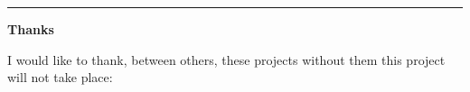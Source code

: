%
%
%

\newpage
\hrule
{}
{}
\begin{flushright}
{\huge \textbf{Thanks}}
\end{flushright}
\vspace{1cm}

\noindent
I would like to thank, between others, these projects without them this project will not take place:

\vspace{1cm}

